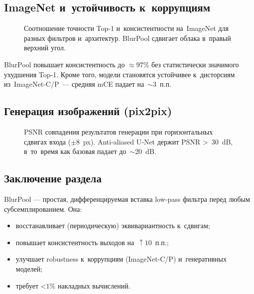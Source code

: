 \subsection{ImageNet и устойчивость к коррупциям}
\begin{figure}[t]
  \centering
  \caption{Соотношение точности Top‑1 и консистентности на ImageNet для разных фильтров и архитектур. BlurPool сдвигает облака в правый верхний угол.}
  \label{fig:imagenet_scatter}
\end{figure}

BlurPool повышает консистентность до $\approx97\%$ без статистически значимого ухудшения Top‑1. Кроме того, модели становятся устойчивее к дисторсиям из ImageNet‑C/P — средняя mCE падает на $\sim3$ п.п.

\subsection{Генерация изображений (pix2pix)}
\begin{figure}[t]
  \centering
  \caption{PSNR совпадения результатов генерации при горизонтальных сдвигах входа ($\pm8$ px). Anti‑aliased U‑Net держит PSNR \textgreater{} 30 dB, в то время как базовая падает до $\sim$20 dB.}
  \label{fig:pix2pix}
\end{figure}

\subsection{Заключение раздела}
BlurPool — простая, дифференцируемая вставка low‑pass фильтра перед любым субсемплированием. Она:
\begin{itemize}
  \item восстанавливает (периодическую) эквивариантность к сдвигам;
  \item повышает консистентность выходов на $\uparrow10$ п.п.;
  \item улучшает robustness к коррупциям (ImageNet‑C/P) и генеративных моделей;
  \item требует \textless{}$1\%$ накладных вычислений.
\end{itemize}

